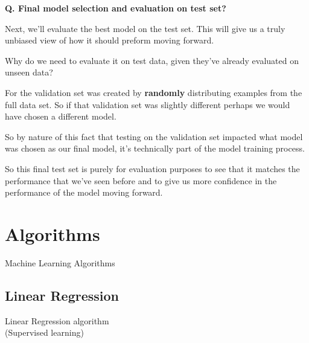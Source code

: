\begin{frame}[fragile]{\textbf{Q. Final model selection and evaluation on test set?}}
  \begin{wideitemize}\small
    \item Next, we'll evaluate the best model on the test set. This will give us
    a truly unbiased view of how it should preform moving forward.
    \item Why do we need to evaluate it on test data, given they've already evaluated on unseen data?
    \medskip
    \begin{wideitemize}
      \item For the validation set was created by \textbf{randomly} distributing examples from
      the full data set. So if that validation set was slightly different perhaps we would
      have chosen a different model.
      \item So by nature of this fact that testing on the validation set impacted what model
      was chosen as our final model, it's technically part of the model training process.
      \item So this final test set is purely for evaluation purposes to see that it matches
      the performance that we've seen before and to give us more confidence in the performance
      of the model moving forward.
    \end{wideitemize}
  \end{wideitemize}
\end{frame}

\section{Algorithms}
\begin{transitionframe}
  \begin{center}
    \Huge Machine Learning Algorithms
  \end{center}
\end{transitionframe}

\subsection{Linear Regression}
\begin{transitionsubframe}
  \begin{center}
    \Huge Linear Regression algorithm\\(Supervised learning)
  \end{center}
\end{transitionsubframe}

